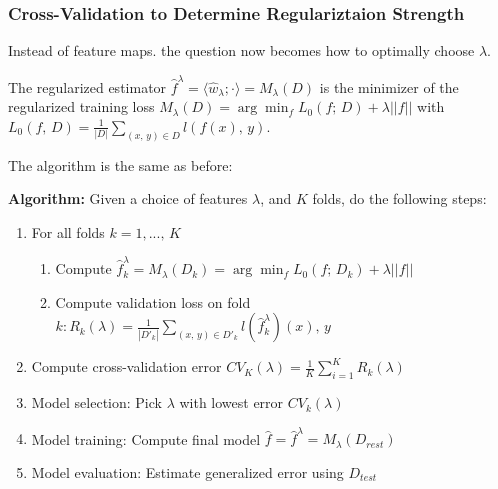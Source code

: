 \documentclass[a4paper]{extarticle}
\begin{document}
\subsubsection{Cross-Validation to Determine Regulariztaion Strength}

Instead of feature maps. the question now becomes how to optimally choose \(\lambda\).

The regularized estimator \(\hat{f}^{\lambda} = \langle \hat{w}_{\lambda}; \cdot \rangle = M_{\lambda}(D)\) is the minimizer of the regularized training loss \(M_{\lambda}(D) = \arg \min_f L_0 (f; \, D) + \lambda ||f||\) with \(L_0 (f, \, D) = \frac{1}{|D|} \sum_{(x, \, y) \in D} l(f(x), \, y)\).

The algorithm is the same as before:

\begin{cbox}
    \textbf{Algorithm:} Given a choice of features \(\lambda\), and \(K\) folds, do the following steps:
    \begin{enumerate}
        \item For all folds \(k = 1,..., \, K\)
        \begin{enumerate}
            \item Compute \(\hat{f}^{\lambda}_k = M_{\lambda}(D_k) = \arg \min_f L_0(f; \, D_k) + \lambda ||f||\)
            \item Compute validation loss on fold \(k : R_{k}(\lambda) = \frac{1}{|D'_k|}\sum_{(x, \, y) \in D'_k}l(\hat{f}^{\lambda}_k)(x), \, y\)
        \end{enumerate}
        \item Compute cross-validation error \(CV_K(\lambda) = \frac{1}{K} \sum_{i = 1}^K R_k(\lambda)\)
        \item Model selection: Pick \(\lambda\) with lowest error \(CV_k(\lambda)\)
        \item Model training: Compute final model \(\hat{f} = \hat{f}^{\lambda} = M_{\lambda}(D_{rest})\)
        \item Model evaluation: Estimate generalized error using \(D_{test}\)
    \end{enumerate}
\end{cbox}
\end{document}
